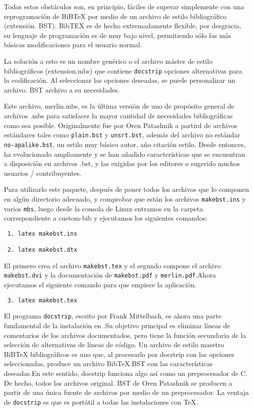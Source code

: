 Todos estos obstáculos son, en principio, fáciles de superar simplemente con una reprogramación de BiB\TeX{} por medio de un archivo de estilo bibliográfico (extensión. BST). BibTEX es de hecho extremadamente flexible, por desgracia, su lenguaje de programación es de muy bajo nivel, permitiendo sólo las más básicas modificaciones para el usuario normal.

La solución a esto es un nombre genérico o el archivo máster de estilo bibliográficos (extension.mbs) que contiene \verb|docstrip| opciones alternativas para la codificación. Al seleccionar las opciones deseadas, se puede personalizar un archivo. BST archivo a su necesidades.

Este archivo, merlin.mbs, es la última versión de uno de propósito general de archivos .mbs para satisfacer la mayor cantidad de necesidades bibliográficas como sea posible. Originalmente fue por Oren Patashnik a partird de archivos estándares tales como  \verb|plain.bst| y \verb|unsrt.bst|, además del archivo no estándar \verb|no-apalike.bst|,  un estilo muy básico autor, año citación estilo. Desde entonces, ha evolucionado ampliamente y se han añadido características que se encuentran a disposición en archivos .bst, y las exigidas por los editores o sugerido muchos usuarios / contribuyentes.

Para utilizarlo este paquete, después de poner todos los archivos que lo componen en algún directorio adecuado, y comprobar que están los archivos \verb|makebst.ins| y varios \verb|mbs|, luego desde la consola de Linux entramos en la carpeta correspondiente a custom-bib y ejecutamos los siguientes comandos:

\begin{verbatim}
 1.	latex makebst.ins

 2.	latex makebst.dtx
\end{verbatim}

El primero crea el archivo \verb|makebst.tex| y el segundo compone el archivo \verb|makebst.dvi| y la documentación de \verb|makebst.pdf| y \verb|merlin.pdf|.Ahora ejecutamos el siguiente comando para que empiece la aplicación.

\begin{verbatim}
 3.	latex makebst.tex
\end{verbatim}

El programa \verb|docstrip|, escrito por Frank Mittelbach, es ahora una parte fundamental de la instalación en \LaTeXe{}.Su objetivo principal es eliminar líneas de comentarios de los archivos documentados, pero tiene la función secundaria de la selección de alternativas de líneas de código.
Un archivo de estilo maestro BiB\TeX{} bibliográficos es uno que, al procesarlo por docstrip con las opciones seleccionadas, produce un archivo Bib\TeX{}.BST con las características deseadas.En este sentido, docstrip funciona  algo así como un preprocesador de C. De hecho, todos los archivos original. BST de Oren Patashnik  se producen a partir de una única fuente de archivos por medio de un preprocesador. La ventaja de \verb|docstrip| es que es portátil a todas las instalaciones con \TeX{}.

